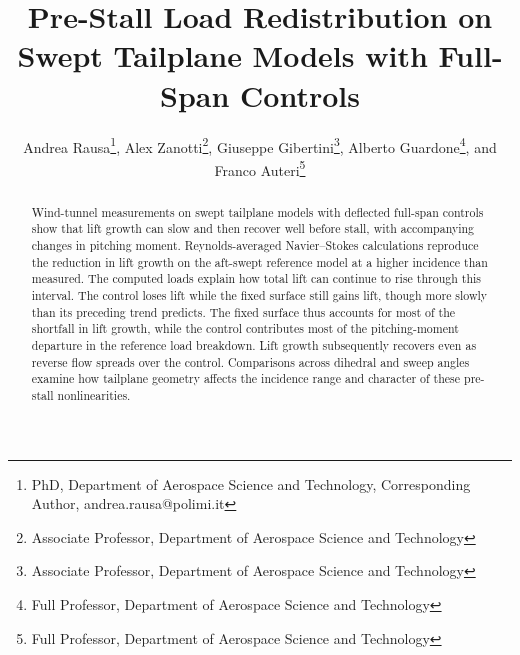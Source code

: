 \documentclass[journal]{new-aiaa}
\title{Pre-Stall Load Redistribution on Swept Tailplane Models with Full-Span Controls}
\author{Andrea Rausa\footnote{PhD, Department of Aerospace Science and Technology, Corresponding Author, andrea.rausa@polimi.it},
Alex Zanotti\footnote{Associate Professor, Department of Aerospace Science and Technology}, Giuseppe Gibertini\footnote{Associate Professor, Department of Aerospace Science and Technology}, Alberto Guardone\footnote{Full Professor, Department of Aerospace Science and Technology}, and Franco Auteri\footnote{Full Professor, Department of Aerospace Science and Technology}}
\affil{Politecnico di Milano, Department of Aerospace Science and Technology, Milano, Italy, 20154}
\begin{document}
\linenumbers
\maketitle
\begin{abstract}
\label{anchor:abstract}
Wind-tunnel measurements on swept tailplane models with deflected full-span controls show that lift growth can slow and then recover well before stall, with accompanying changes in pitching moment. Reynolds-averaged Navier--Stokes calculations reproduce the reduction in lift growth on the aft-swept reference model at a higher incidence than measured. The computed loads explain how total lift can continue to rise through this interval. The control loses lift while the fixed surface still gains lift, though more slowly than its preceding trend predicts. The fixed surface thus accounts for most of the shortfall in lift growth, while the control contributes most of the pitching-moment departure in the reference load breakdown. Lift growth subsequently recovers even as reverse flow spreads over the control. Comparisons across dihedral and sweep angles examine how tailplane geometry affects the incidence range and character of these pre-stall nonlinearities.
\end{abstract}
\end{document}
